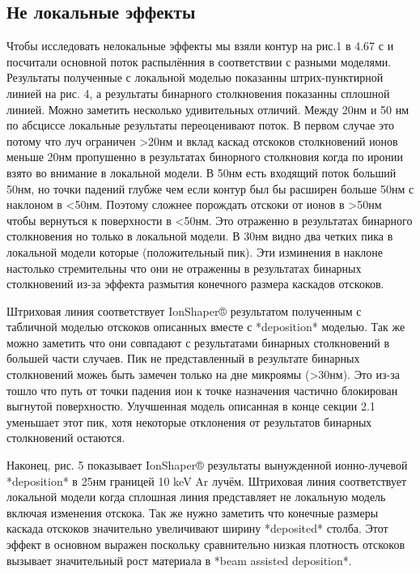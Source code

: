 \documentclass[a4paper,fontsize=12pt]{article}
\begin{document}
\subsection{Не локальные эффекты}

Чтобы исследовать нелокальные эффекты мы взяли контур на рис.1 в 4.67 с и посчитали основной поток распылённия в соответствии с разными моделями. Результаты полученные с локальной моделью показанны штрих-пунктирной линией на рис. 4, а результаты бинарного столкновения показанны сплошной линией. Можно заметить несколько удивительных отличий. Между 20нм и 50 нм по абсциссе локальные результаты переоценивают поток. В первом случае это потому что луч ограничен >20нм и вклад каскад отскоков столкновений ионов меньше 20нм пропушенно в результатах бинорного столкновия когда по иронии взято во внимание в локальной модели. В 50нм есть входящий поток больший 50нм, но точки падений глубже чем если контур был бы расширен больше 50нм с наклоном в <50нм. Поэтому сложнее порождать отскоки от ионов в >50нм чтобы вернуться к поверхности в <50нм. Это отраженно в результатах бинарного столкновения но только в локальной модели. В 30нм видно два четких пика в локальной модели которые (положительный пик). Эти изминения в наклоне настолько стремительны что они не отраженны в результатах бинарных столкновений из-за эффекта размытия конечного размера каскадов отскоков.

Штриховая линия соответствует  IonShaper® результатом полученным с табличной моделью отскоков описанных вместе с *deposition* моделью. Так же можно заметить что они совпадают с результатами бинарных столкновений в большей части случаев. Пик не представленный в результате бинарных столкновений можеь быть замечен только на дне микроямы (>30нм). Это из-за тошло что путь от точки падения ион к точке назначения частично блокирован выгнутой поверхностю. Улучшенная модель описанная в конце секции 2.1 уменьшает этот пик, хотя некоторые отклонения от результатов бинарных столкновений остаются.

Наконец, рис. 5 показывает IonShaper® результаты вынужденной ионно-лучевой  *deposition* в 25нм границей 10 keV Ar лучём. Штриховая линия соответствует локальной модели когда сплошная линия представляет не локальную модель включая изменения отскока. Так же нужно заметить что конечные размеры каскада отскоков значительно увеличивают ширину *deposited* столба. Этот эффект в основном выражен поскольку сравнительно низкая плотность отскоков вызывает значительный рост материала в *beam assisted deposition*.
\end{document}
